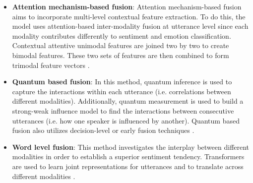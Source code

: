 \begin{itemize}
    \item \textbf{Attention mechanism-based fusion}: Attention mechanism-based fusion aims to incorporate multi-level contextual feature extraction. To do this, the model uses attention-based inter-modality fusion at utterance level since each modality contributes differently to sentiment and emotion classification. Contextual attentive unimodal features are joined two by two to create bimodal features. These two sets of features are then combined to form trimodal feature vectors \cite{MSA_review2_GANDHI2023424}. \\
    \item \textbf{Quantum based fusion}: In this method, quantum inference is used to capture the interactions within each utterance (i.e. correlations between different modalities). Additionally, quantum measurement is used to build a strong-weak influence model to find the interactions between consecutive utterances (i.e. how one speaker is influenced by another). Quantum based fusion also utilizes decision-level or early fusion techniques \cite{MSA-review-3-9686504}. \\
    \item \textbf{Word level fusion}: This method investigates the interplay between different modalities in order to establish a superior sentiment tendency. Transformers are used to learn joint representations for utterances and to translate across different modalities \cite{MSA_review2_GANDHI2023424}. 
\end{itemize}

